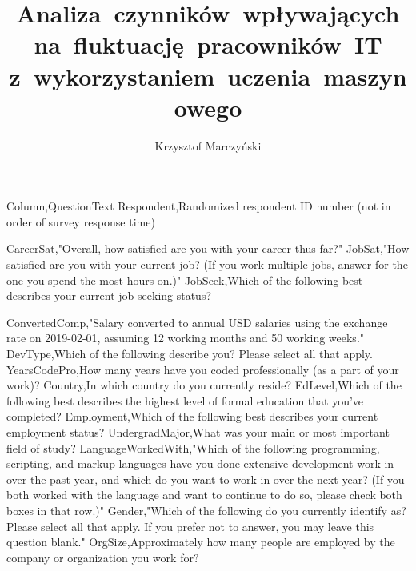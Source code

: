 \documentclass{dyplom}
\author{Krzysztof Marczyński}
\title{Analiza~czynników~wpływających na~fluktuację~pracowników~IT z~wykorzystaniem~uczenia~maszynowego}
\begin{document}
    \sloppy %
    \singlespacing
    \maketitle
    \onehalfspacing
    
    \cleardoublepage

    \tableofcontents
    \cleardoublepage

    \setlength{\parskip}{10pt}%
    

%    

    
    
    

    

    \cleardoublepage
    
    

    \listnormal{\listoftables}{\listtablename}
    \listnormal{\listoffigures}{\listfigurename}

    \lstlistoflistings %

    
Column,QuestionText
Respondent,Randomized respondent ID number (not in order of survey response time)


CareerSat,"Overall, how satisfied are you with your career thus far?"
JobSat,"How satisfied are you with your current job? (If you work multiple jobs, answer for the one you spend the most hours on.)"
JobSeek,Which of the following best describes your current job-seeking status?


ConvertedComp,"Salary converted to annual USD salaries using the exchange rate on 2019-02-01, assuming 12 working months and 50 working weeks."
DevType,Which of the following describe you? Please select all that apply.
YearsCodePro,How many years have you coded professionally (as a part of your work)?
Country,In which country do you currently reside?
EdLevel,Which of the following best describes the highest level of formal education that you’ve completed?
Employment,Which of the following best describes your current employment status?
UndergradMajor,What was your main or most important field of study?
LanguageWorkedWith,"Which of the following programming, scripting, and markup languages have you done extensive development work in over the past year, and which do you want to work in over the next year?  (If you both worked with the language and want to continue to do so, please check both boxes in that row.)"
Gender,"Which of the following do you currently identify as? Please select all that apply. If you prefer not to answer, you may leave this question blank."
OrgSize,Approximately how many people are employed by the company or organization you work for?
\end{document}
